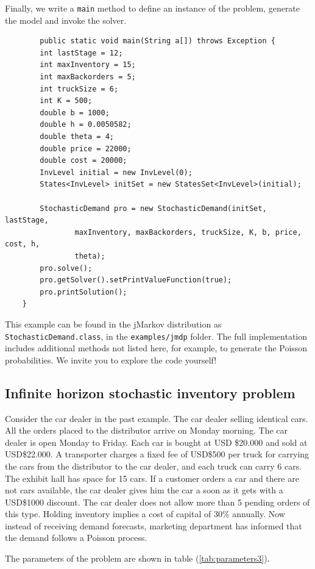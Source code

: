 \documentclass[11pt]{article}
\begin{document}
Finally, we write a \lstinline!main! method to define an instance of the problem, generate the model and invoke the solver.

  \begin{lstlisting}
        public static void main(String a[]) throws Exception {
        int lastStage = 12;
        int maxInventory = 15;
        int maxBackorders = 5;
        int truckSize = 6;
        int K = 500;
        double b = 1000;
        double h = 0.0050582;
        double theta = 4;
        double price = 22000;
        double cost = 20000;
        InvLevel initial = new InvLevel(0);
        States<InvLevel> initSet = new StatesSet<InvLevel>(initial);

        StochasticDemand pro = new StochasticDemand(initSet, lastStage,
                maxInventory, maxBackorders, truckSize, K, b, price, cost, h,
                theta);
        pro.solve();
        pro.getSolver().setPrintValueFunction(true);
        pro.printSolution();
    }
\end{lstlisting}

This example can be found in the jMarkov distribution as \lstinline!StochasticDemand.class!, in the \lstinline!examples/jmdp! folder. The full implementation includes additional methods not listed here, for example, to generate the Poisson probabilities. We invite you to explore the code yourself!


\subsection{Infinite horizon stochastic inventory problem}

Consider the car dealer in the past example. The car dealer selling identical cars. All the orders placed to the distributor arrive on Monday morning. The car dealer is open Monday to Friday. Each car is bought at USD \$20.000 and sold at USD\$22.000. A transporter charges a fixed fee of USD\$500 per truck for carrying the cars from the distributor to the car dealer, and each truck can carry 6 cars. The exhibit hall has space for 15 cars. If a customer orders a car and there are not cars available, the car dealer gives him the car a soon as it gets with a USD\$1000 discount. The car dealer does not allow more than 5 pending orders of this type. Holding inventory implies a cost of capital of 30\% annually. Now instead of receiving demand forecasts, marketing department has informed that the demand follows a Poisson process.

The parameters of the problem are shown in table (\ref{tab:parameters3}).
\end{document}
